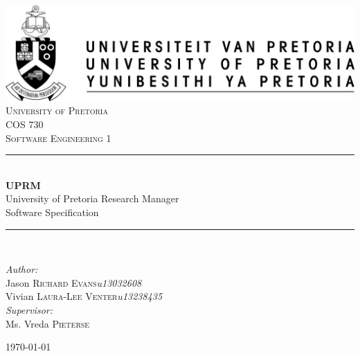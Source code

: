 \documentclass[12pt]{article}
\begin{document}
	\begin{titlepage}
		\newcommand{\HRule}{\rule{\linewidth}{0.5mm}}
		\center
		
		\includegraphics{up-logo.jpg} \\[1cm]
		
		\textsc{\LARGE University of Pretoria}\\[1.5cm]
		\textsc{\Large COS 730}\\[0.5cm]
		\textsc{\large Software Engineering 1}\\[0.5cm]

		\HRule \\[0.4cm]
		{ \huge \bfseries UPRM}\\[0.4cm]
		{\large University of Pretoria Research Manager}\\
		{Software Specification}\\
		\HRule \\[1.5cm]
		
		\begin{minipage}{1\textwidth}
			\begin{flushleft} \large
				\emph{Author:}\\
				Jason \textsc{Richard Evans}\hfill \emph{u13032608}\\
				Vivian \textsc{Laura-Lee Venter}\hfill \emph{u13238435} \\[1cm]
				\emph{Supervisor:} \\
				Ms. Vreda \textsc{Pieterse}\\
			\end{flushleft}
		\end{minipage}
		
		\vfill
		{\large \today}\\[6cm]
		\vfill	
	\end{titlepage}
\end{document}

